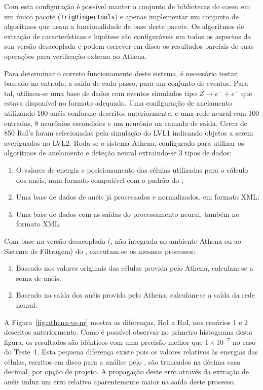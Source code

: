 Com esta configuração é possível manter o conjunto de bibliotecas do
 coeso em um único pacote (\texttt{TrigRingerTools}) e
apenas implementar um conjunto de algoritmos que usam a funcionalidade de base
deste pacote. Os algoritmos de extração de características e hipótese são
configuráveis em todos os aspectos da sua versão desacoplada e podem escrever
em disco os resultados parciais de suas operações para verificação externa ao
Athena.

Para determinar o correto funcionamento deste sistema, é necessário testar,
baseado na entrada, a saída de cada passo, para um conjunto de eventos. Para
tal, utilizou-se uma base de dados com eventos simulados tipo $Z \rightarrow
e^- + e^-$ que estava disponível no formato adequado. Uma configuração de
anelamento utilizando 100 anéis conforme descritos anteriormente, e uma rede
neural com 100 entradas, 8 neurônios escondidos e um neurônio na camada de
saída. Cerca de 850 RoI's foram selecionadas pela simulação do LVL1 indicando
objetos a serem averiguados no LVL2. Roda-se o sistema Athena, configurado
para utilizar os algoritmos de anelamento e deteção neural extraindo-se 3
tipos de dados:

\begin{enumerate}
\item O valores de energia e posicionamento das células utilizadas para o
cálculo dos anéis, num formato compatível com o padrão do ; 
\item Uma base de dados de anéis já processados e normalizados, em formato
XML;
\item Uma base de dados com as saídas do processamento neural, também no
formato XML.
\end{enumerate}

Com base na versão desacoplada (, não integrada ao ambiente
Athena ou ao Sistema de Filtragem) do , executam-se os mesmos
processos:

\begin{enumerate}
\item Baseado nos valores originais das células provida pelo Athena, calculam-se
a soma de anéis; 
\item Baseado na saída dos anéis provida pelo Athena, calculam-se a saída da
rede neural.
\end{enumerate}

A Figura~\ref{fig:athena-vs-nr} mostra as diferenças, RoI a RoI, nos cenários
1 e 2 descritos anteriormente. Como é possível observar no primeiro histograma
desta figura, os resultados são idênticos com uma precisão melhor que $1
\times 10^{-7}$ no caso do Teste~1. Esta pequena diferença existe pois os
valores relativos às energias das células, escritos em disco para a análise
pelo , são truncados na décima casa decimal, por opção de
projeto. A propagação deste erro através da extração de anéis induz um erro
relativo aparentemente maior na saída deste processo.

